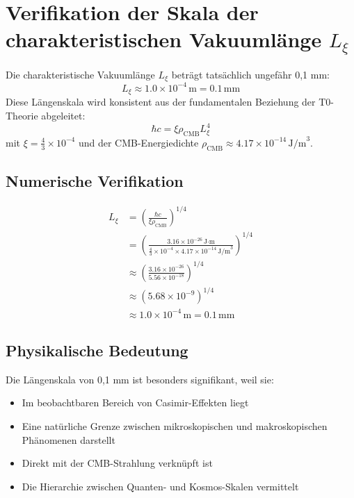 \documentclass[12pt,a4paper]{article}
\numberwithin{equation}{section}
\begin{document}
	\section*{Verifikation der Skala der charakteristischen Vakuumlänge $L_\xi$}
	
	\begin{important}
		Die charakteristische Vakuumlänge $L_\xi$ beträgt tatsächlich ungefähr 0,1 mm:
		\[
		L_\xi \approx 1.0 \times 10^{-4}\,\text{m} = 0.1\,\text{mm}
		\]
		Diese Längenskala wird konsistent aus der fundamentalen Beziehung der T0-Theorie abgeleitet:
		\[
		\hbar c = \xi \rho_{\text{CMB}} L_\xi^4
		\]
		mit $\xi = \frac{4}{3} \times 10^{-4}$ und der CMB-Energiedichte $\rho_{\text{CMB}} \approx 4.17 \times 10^{-14}\,\text{J/m}^3$.
	\end{important}
	
	\subsection*{Numerische Verifikation}
	
	\begin{align*}
		L_\xi &= \left(\frac{\hbar c}{\xi \rho_{\text{CMB}}}\right)^{1/4} \\
		&= \left(\frac{3.16 \times 10^{-26}\,\text{J·m}}{\frac{4}{3} \times 10^{-4} \times 4.17 \times 10^{-14}\,\text{J/m}^3}\right)^{1/4} \\
		&\approx \left(\frac{3.16 \times 10^{-26}}{5.56 \times 10^{-18}}\right)^{1/4} \\
		&\approx \left(5.68 \times 10^{-9}\right)^{1/4} \\
		&\approx 1.0 \times 10^{-4}\,\text{m} = 0.1\,\text{mm}
	\end{align*}
	
	\subsection*{Physikalische Bedeutung}
	
	Die Längenskala von 0,1 mm ist besonders signifikant, weil sie:
	\begin{itemize}
		\item Im beobachtbaren Bereich von Casimir-Effekten liegt
		\item Eine natürliche Grenze zwischen mikroskopischen und makroskopischen Phänomenen darstellt
		\item Direkt mit der CMB-Strahlung verknüpft ist
		\item Die Hierarchie zwischen Quanten- und Kosmos-Skalen vermittelt
	\end{itemize}
\end{document}
